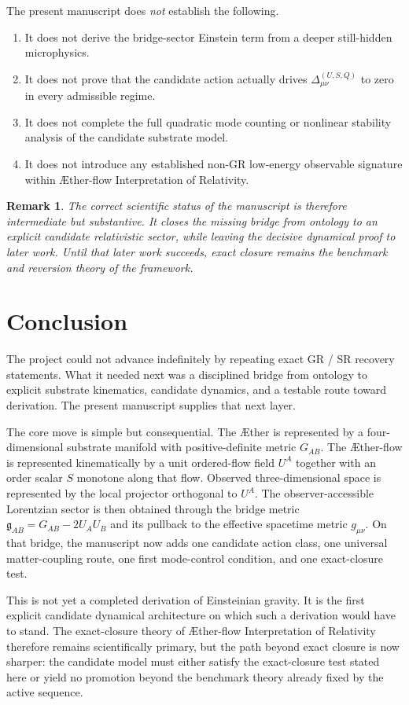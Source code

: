 \documentclass[11pt]{article}
\newcommand{\Aether}{\AE{}ther}
\newcommand{\Aflow}{\AE{}ther-flow}
\newcommand{\TheoryName}{\Aflow{} Interpretation of Relativity}
\newcommand{\BridgeMetric}{\mathfrak{g}}
\newtheorem{remark}{Remark}
\begin{document}
The present manuscript does \emph{not} establish the following.
\begin{enumerate}
    \item It does not derive the bridge-sector Einstein term from a deeper still-hidden microphysics.
    \item It does not prove that the candidate action actually drives \(\Delta_{\mu\nu}^{(U,S,Q)}\) to zero in every admissible regime.
    \item It does not complete the full quadratic mode counting or nonlinear stability analysis of the candidate substrate model.
    \item It does not introduce any established non-GR low-energy observable signature within \TheoryName{}.
\end{enumerate}

\begin{remark}
The correct scientific status of the manuscript is therefore intermediate but substantive. It closes the missing bridge from ontology to an explicit candidate relativistic sector, while leaving the decisive dynamical proof to later work. Until that later work succeeds, exact closure remains the benchmark and reversion theory of the framework.
\end{remark}

\section{Conclusion}

The project could not advance indefinitely by repeating exact GR / SR recovery statements. What it needed next was a disciplined bridge from ontology to explicit substrate kinematics, candidate dynamics, and a testable route toward derivation. The present manuscript supplies that next layer.

The core move is simple but consequential. The \Aether{} is represented by a four-dimensional substrate manifold with positive-definite metric \(G_{AB}\). The \Aflow{} is represented kinematically by a unit ordered-flow field \(U^A\) together with an order scalar \(S\) monotone along that flow. Observed three-dimensional space is represented by the local projector orthogonal to \(U^A\). The observer-accessible Lorentzian sector is then obtained through the bridge metric \(\BridgeMetric_{AB}=G_{AB}-2U_AU_B\) and its pullback to the effective spacetime metric \(g_{\mu\nu}\). On that bridge, the manuscript now adds one candidate action class, one universal matter-coupling route, one first mode-control condition, and one exact-closure test.

This is not yet a completed derivation of Einsteinian gravity. It is the first explicit candidate dynamical architecture on which such a derivation would have to stand. The exact-closure theory of \TheoryName{} therefore remains scientifically primary, but the path beyond exact closure is now sharper: the candidate model must either satisfy the exact-closure test stated here or yield no promotion beyond the benchmark theory already fixed by the active sequence.
\end{document}
